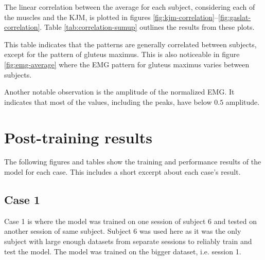 \documentclass[../main.tex]{subfiles}
\begin{document}
The linear correlation between the average for each subject, considering each of the muscles and the \ac{KJM}, is plotted in figures \ref{fig:kjm-correlation}--\ref{fig:gaslat-correlation}.
Table \ref{tab:correlation-sumup} outlines the results from these plots.

This table indicates that the patterns are generally correlated between subjects, except for the pattern of gluteus maximus.
This is also noticeable in figure \ref{fig:emg-average} where the \ac{EMG} pattern for gluteus maximus varies between subjects.

Another notable observation is the amplitude of the normalized \ac{EMG}.
It indicates that most of the values, including the peaks, have below $0.5$ amplitude.


\section{Post-training results}
\label{sec:post-training-results}
The following figures and tables show the training and performance results of the model for each case.
This includes a short excerpt about each case's result.

\subsection{Case 1}
\label{sec:results-case1}
Case 1 is where the model was trained on one session of subject 6 and tested on another session of same subject.
Subject 6 was used here as it was the only subject with large enough datasets from separate sessions to reliably train and test the model.
The model was trained on the bigger dataset, i.e. session 1.
\end{document}
